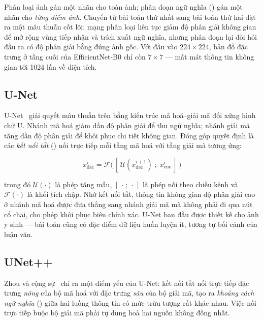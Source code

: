 Phân loại ảnh gán một nhãn cho toàn ảnh; phân đoạn ngữ nghĩa
() gán một nhãn cho \emph{từng điểm ảnh}. Chuyển từ bài
toán thứ nhất sang bài toán thứ hai đặt ra một mâu thuẫn cốt lõi: mạng phân loại
liên tục giảm độ phân giải không gian để mở rộng vùng tiếp nhận và trích xuất ngữ
nghĩa, nhưng phân đoạn lại đòi hỏi đầu ra có độ phân giải bằng đúng ảnh gốc. Với
đầu vào $224 \times 224$, bản đồ đặc trưng ở tầng cuối của EfficientNet-B0 chỉ
còn $7 \times 7$ --- mất mát thông tin không gian tới 1024 lần về diện tích.

\subsection{U-Net}

U-Net~\cite{ronneberger2015unet} giải quyết mâu thuẫn trên bằng kiến trúc mã
hoá--giải mã đối xứng hình chữ U. Nhánh mã hoá giảm dần độ phân giải để thu ngữ
nghĩa; nhánh giải mã tăng dần độ phân giải để khôi phục chi tiết không gian. Đóng
góp quyết định là các \emph{kết nối tắt} () nối trực tiếp mỗi
tầng mã hoá với tầng giải mã tương ứng:

\begin{equation}
    x^{i}_{\text{dec}} = \mathcal{F}\big(\,[\,\mathcal{U}(x^{i+1}_{\text{dec}}) \;;\; x^{i}_{\text{enc}}\,]\,\big)
    \label{eq:unet_skip}
\end{equation}

trong đó $\mathcal{U}(\cdot)$ là phép tăng mẫu, $[\,\cdot\,;\,\cdot\,]$ là phép
nối theo chiều kênh và $\mathcal{F}(\cdot)$ là khối tích chập. Nhờ kết nối tắt,
thông tin không gian độ phân giải cao ở nhánh mã hoá được đưa thẳng sang nhánh
giải mã mà không phải đi qua nút cổ chai, cho phép khôi phục biên chính xác. U-Net
ban đầu được thiết kế cho ảnh y sinh --- bài toán cũng có đặc điểm dữ liệu huấn
luyện ít, tương tự bối cảnh của luận văn.

\subsection{UNet++}

Zhou và cộng sự~\cite{zhou2018unetpp} chỉ ra một điểm yếu của U-Net: kết nối tắt
nối trực tiếp đặc trưng \emph{nông} của bộ mã hoá với đặc trưng \emph{sâu} của bộ
giải mã, tạo ra \emph{khoảng cách ngữ nghĩa} () giữa hai luồng
thông tin có mức trừu tượng rất khác nhau. Việc nối trực tiếp buộc bộ giải mã phải
tự dung hoà hai nguồn không đồng nhất.


